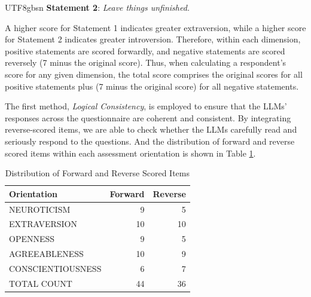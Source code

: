 \documentclass{article}
\theoremstyle{plain}
\theoremstyle{definition}
\theoremstyle{remark}
\begin{document}
\begin{CJK*}{UTF8}{gbsn}
\textbf{Statement 2}: \textit{Leave things unfinished.}

A higher score for Statement 1 indicates greater extraversion, while a higher score for Statement 2 indicates greater introversion. Therefore, within each dimension, positive statements are scored forwardly, and negative statements are scored reversely (7 minus the original score). Thus, when calculating a respondent's score for any given dimension, the total score comprises the original scores for all positive statements plus (7 minus the original score) for all negative statements.

The first method, \textit{Logical Consistency}, is employed to ensure that the LLMs' responses across the questionnaire are coherent and consistent. By integrating reverse-scored items, we are able to check whether the LLMs carefully read and seriously respond to the questions.  And the distribution of forward and reverse scored items within each assessment orientation is shown in Table \ref{table-items}.

\begin{table}[t]
\caption{Distribution of Forward and Reverse Scored Items}
\vskip 0.15in
\centering
\begin{tabular}{lrr}
\hline
\textbf{Orientation} & \textbf{Forward} & \textbf{Reverse}\\
\hline
NEUROTICISM & 9 & 5 \\
EXTRAVERSION & 10 & 10 \\
OPENNESS & 9 & 5 \\ 
AGREEABLENESS & 10 & 9 \\ 
CONSCIENTIOUSNESS & 6 & 7 \\  
TOTAL COUNT & 44 & 36 \\  
\hline
\end{tabular}
\label{table-items}
\vskip -0.1in
\end{table}



\end{CJK*}
\end{document}
